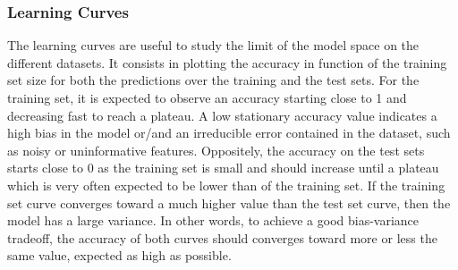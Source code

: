 \documentclass[preprint,12pt]{elsarticle}
\theoremstyle{definition}
\begin{document}
\subsubsection{Learning Curves} The learning curves are useful to study the limit of the model space on the different datasets. It consists in plotting the accuracy in function of the training set size for both the predictions over the training and the test sets. For the training set, it is expected to observe an accuracy starting close to 1 and decreasing fast to reach a plateau. A low stationary accuracy value indicates a high bias in the model or/and an irreducible error contained in the dataset, such as noisy or uninformative features. Oppositely, the accuracy on the test sets starts close to 0 as the training set is small and should increase until a plateau which is very often expected to be lower than of the training set. If the training set curve converges toward a much higher value than the test set curve, then the model has a large variance. In other words, to achieve a good bias-variance tradeoff, the accuracy of both curves should converges toward more or less the same value, expected as high as possible.
\end{document}
